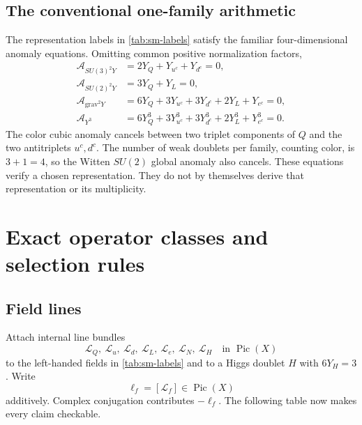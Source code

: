 \documentclass[11pt]{article}
\newcommand{\Pic}{\operatorname{Pic}}
\newcommand{\Line}{\mathcal{L}}
\begin{document}
\subsection{The conventional one-family arithmetic}

The representation labels in \cref{tab:sm-labels} satisfy the familiar
four-dimensional anomaly equations. Omitting common positive normalization
factors,
\begin{align}
\mathcal A_{SU(3)^2Y}
 &=2Y_Q+Y_{u^c}+Y_{d^c}=0,\\
\mathcal A_{SU(2)^2Y}
 &=3Y_Q+Y_L=0,\\
\mathcal A_{\mathrm{grav}^2Y}
 &=6Y_Q+3Y_{u^c}+3Y_{d^c}+2Y_L+Y_{e^c}=0,\\
\mathcal A_{Y^3}
 &=6Y_Q^3+3Y_{u^c}^3+3Y_{d^c}^3+2Y_L^3+Y_{e^c}^3=0.
\end{align}
The color cubic anomaly cancels between two triplet components of \(Q\) and
the two antitriplets \(u^c,d^c\). The number of weak doublets per family,
counting color, is \(3+1=4\), so the Witten \(SU(2)\) global anomaly also
cancels. These equations verify a chosen representation. They do not by
themselves derive that representation or its multiplicity.

\section{Exact operator classes and selection rules}

\subsection{Field lines}

Attach internal line bundles
\[
\Line_Q,\ \Line_u,\ \Line_d,\ \Line_L,\ \Line_e,\
\Line_N,\ \Line_H
\quad\text{in }\Pic(X)
\]
to the left-handed fields in \cref{tab:sm-labels} and to a Higgs doublet
\(H\) with \(6Y_H=3\). Write
\[
\ell_f=[\Line_f]\in\Pic(X)
\]
additively. Complex conjugation contributes \(-\ell_f\). The following table
now makes every claim checkable.
\end{document}
